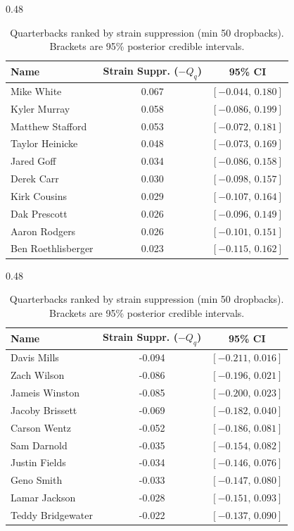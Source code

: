 \begin{table}[h!]
\centering
\begin{subtable}{0.48\textwidth}
\centering
\footnotesize
\begin{tabular}{lcc}
\toprule
Name & Strain Suppr. ($-Q_q$) & 95\% CI \\
\midrule
Mike White & 0.067 & $[-0.044,\,0.180]$ \\
Kyler Murray & 0.058 & $[-0.086,\,0.199]$ \\
Matthew Stafford & 0.053 & $[-0.072,\,0.181]$ \\
Taylor Heinicke & 0.048 & $[-0.073,\,0.169]$ \\
Jared Goff & 0.034 & $[-0.086,\,0.158]$ \\
Derek Carr & 0.030 & $[-0.098,\,0.157]$ \\
Kirk Cousins & 0.029 & $[-0.107,\,0.164]$ \\
Dak Prescott & 0.026 & $[-0.096,\,0.149]$ \\
Aaron Rodgers & 0.026 & $[-0.101,\,0.151]$ \\
Ben Roethlisberger & 0.023 & $[-0.115,\,0.162]$ \\
\bottomrule
\end{tabular}
\caption{Most strain-suppressing}
\end{subtable}
\hfill
\begin{subtable}{0.48\textwidth}
\centering
\footnotesize
\begin{tabular}{lcc}
\toprule
Name & Strain Suppr. ($-Q_q$) & 95\% CI \\
\midrule
Davis Mills & -0.094 & $[-0.211,\,0.016]$ \\
Zach Wilson & -0.086 & $[-0.196,\,0.021]$ \\
Jameis Winston & -0.085 & $[-0.200,\,0.023]$ \\
Jacoby Brissett & -0.069 & $[-0.182,\,0.040]$ \\
Carson Wentz & -0.052 & $[-0.186,\,0.081]$ \\
Sam Darnold & -0.035 & $[-0.154,\,0.082]$ \\
Justin Fields & -0.034 & $[-0.146,\,0.076]$ \\
Geno Smith & -0.033 & $[-0.147,\,0.080]$ \\
Lamar Jackson & -0.028 & $[-0.151,\,0.093]$ \\
Teddy Bridgewater & -0.022 & $[-0.137,\,0.090]$ \\
\bottomrule
\end{tabular}
\caption{Least strain-suppressing}
\end{subtable}
\hfill
\caption{Quarterbacks ranked by strain suppression (min 50 dropbacks). Brackets are 95\% posterior credible intervals.}
\label{tab:qb_suppression}
\end{table}
